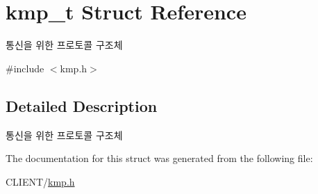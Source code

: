 \hypertarget{structkmp__t}{\section{kmp\-\_\-t Struct Reference}
\label{structkmp__t}
}


통신을 위한 프로토콜 구조체  




{\ttfamily \#include $<$kmp.\-h$>$}



\subsection{Detailed Description}
통신을 위한 프로토콜 구조체 

The documentation for this struct was generated from the following file\-:\begin{DoxyCompactItemize}
\item 
C\-L\-I\-E\-N\-T/\hyperlink{kmp_8h}{kmp.\-h}\end{DoxyCompactItemize}
